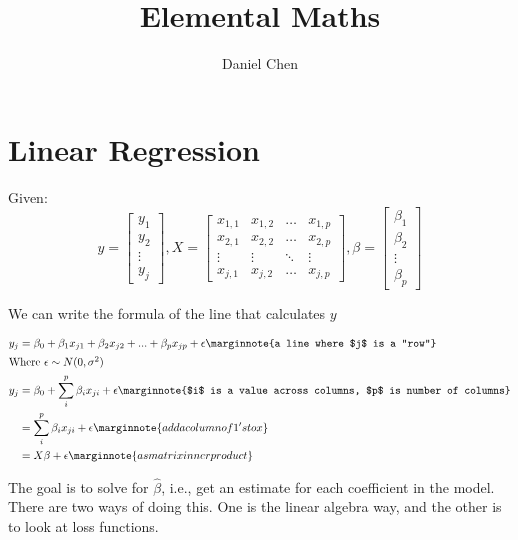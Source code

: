 \documentclass[10pt,letterpaper,twoside]{article}
\author{Daniel Chen}
\title{Elemental Maths}
\date{}
\begin{document}
    \maketitle
\section{Linear Regression}

Given:
\[
y = 
    \begin{bmatrix}
        y_1\\
        y_2\\
        \vdots\\
        y_j
    \end{bmatrix}
,
X =
    \begin{bmatrix}
        x_{1,1} & x_{1, 2} & \hdots & x_{1, p}\\
        x_{2,1} & x_{2, 2} & \hdots & x_{2, p}\\
        \vdots  & \vdots   & \ddots & \vdots\\
        x_{j,1} & x_{j, 2} & \hdots & x_{j, p}
    \end{bmatrix}
,
\beta = 
    \begin{bmatrix}
        \beta_1\\
        \beta_2\\
        \vdots\\
        \beta_p
    \end{bmatrix}
\]

\vspace{.5cm}
We can write the formula of the line that calculates $y$

\begin{align}
    y_j &= \beta_0 + \beta_1 x_{j1} + \beta_2 x_{j2} + ... + \beta_p x_{jp} + \epsilon
          \marginnote{a line where $j$ is a "row"}\\
    \intertext{Where $\epsilon \sim N(0, \sigma^2$)}
    y_j &= \beta_0 + \sum_{i}^{p}\beta_i x_{ji} + \epsilon
          \marginnote{$i$ is a value across columns, $p$ is number of columns}\\
        &= \sum_{i}^{p}\beta_i x_{ji} + \epsilon
          \marginnote{add a column of 1's to x}\\
        &= X\beta + \epsilon
          \marginnote{as matrix inner product}
\end{align}

The goal is to solve for $\hat{\beta}$, i.e.,
get an estimate for each coefficient in the model.
There are two ways of doing this.
One is the linear algebra way, and the other is to look at loss functions.
\end{document}
